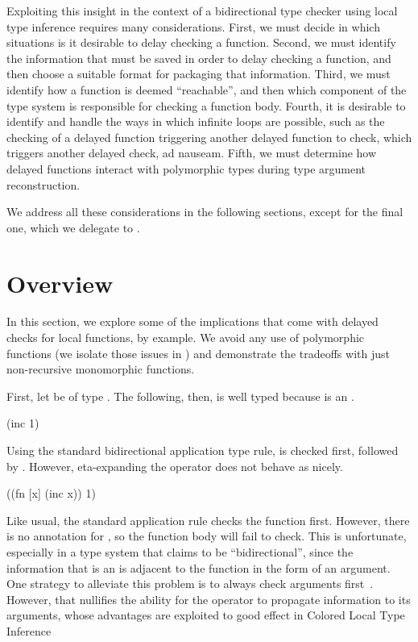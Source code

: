 Exploiting this insight in the context of a bidirectional type checker using
local type inference requires many considerations.
First, we must decide in which situations is it desirable to delay checking a function.
Second, we must identify the information that must be saved in order to delay checking a function,
and then choose a suitable format for packaging that information.
Third, we must identify how a function is deemed ``reachable'',
and then which component of the type system is responsible for checking a function body.
Fourth, it is desirable to identify and handle the ways in which 
infinite loops are possible, such as the checking of a delayed function triggering
another delayed function to check, which triggers another delayed check, ad nauseam.
Fifth, we must determine how delayed functions interact with polymorphic types
during type argument reconstruction.

We address all these considerations in the following sections, except
for the final one, which we delegate to .

\section{Overview}
\label{symbolic:section:overview}

In this section, we explore some of the implications that come with delayed checks for local functions,
by example.
We avoid any use of polymorphic functions
(we isolate those issues in )
and demonstrate the tradeoffs with just non-recursive monomorphic functions.

First, let  be of type .
The following, then, is well typed because  is an .

\begin{cljlisting}
(inc 1)
\end{cljlisting}

Using the standard bidirectional application type rule,  is checked first,
followed by .
However, eta-expanding the operator does not behave as nicely.

\begin{cljlisting}
((fn [x] (inc x)) 1)
\end{cljlisting}

Like usual, the standard application rule checks the function first.
However, there is no annotation for , so the function body will fail
to check.
This is unfortunate, especially in a type system that claims to be ``bidirectional'',
since the information that  is an  is adjacent to the function
in the form of an argument.
One strategy to alleviate this problem is to always check arguments first~\cite{xie2018let}.
However, that nullifies the ability for the operator to propagate information
to its arguments, whose advantages are exploited to good effect in Colored Local Type Inference~\cite{coloredlti01}

